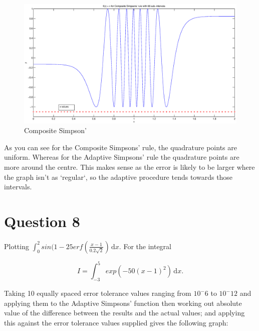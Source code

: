 \documentclass[fleqn]{report}
\begin{document}
\pagebreak

\begin{figure}[h!]
\begin{center}
    \centerline{\includegraphics[width=1.8\textwidth]{q7composite.eps}}
    \caption{Composite Simpson'}
\end{center}
\end{figure}

As you can see for the Composite Simpsons' rule, the quadrature points 
are uniform. Whereas for the Adaptive Simpsons' rule the quadrature points
are more around the centre. This makes sense as the error
is likely to be larger where the graph isn't as `regular`, so the
adaptive procedure tends towards those intervals.

\pagebreak

\section{Question 8}

Plotting $ \int_0^2 \! sin(1 - 25erf(\frac{x-1}{0.2\sqrt{2}}) \,\mathrm{d}x.$ 
For the integral 

\begin{equation*}
I = \int_{-3}^5 \! exp(-50(x-1)^{2}) \,\mathrm{d}x.
\end{equation*}

Taking 10 equally spaced error tolerance values ranging from $10^-6$ to $10^-12$
and applying them to the Adaptive Simpsons' function then working out
absolute value of the difference between the results and the actual values; and applying
this against the error tolerance values supplied gives the following graph:

\newpage
\end{document}
